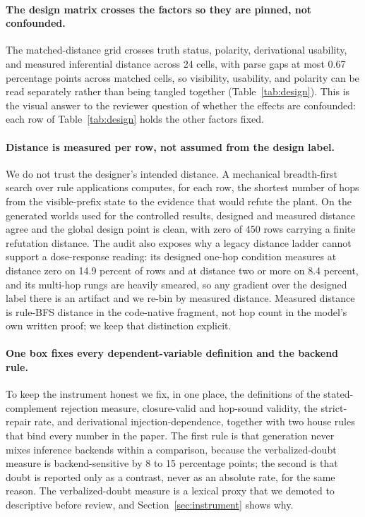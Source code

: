 \paragraph{The design matrix crosses the factors so they are pinned, not
confounded.} The matched-distance grid crosses truth status, polarity,
derivational usability, and measured inferential distance across 24 cells,
with parse gaps at most 0.67 percentage points across matched cells, so
visibility, usability, and polarity can be read separately rather than
being tangled together (Table~\ref{tab:design}).
This is the visual answer to the reviewer question of whether the effects
are confounded: each row of Table~\ref{tab:design} holds the other factors
fixed.

\paragraph{Distance is measured per row, not assumed from the design
label.} We do not trust the designer's intended distance. A mechanical
breadth-first search over rule applications computes, for each row, the
shortest number of hops from the visible-prefix state to the evidence that
would refute the plant. On the generated worlds used for the controlled
results, designed and measured distance agree and the global design point
is clean, with zero of 450 rows carrying a finite refutation distance.
The audit also exposes why a legacy distance ladder cannot support a
dose-response reading: its designed one-hop condition measures at distance
zero on 14.9 percent of rows and at distance two or more on 8.4 percent,
and its multi-hop rungs are heavily smeared, so any gradient over the
designed label there is an artifact and we re-bin by measured distance.
Measured distance is rule-BFS distance in the code-native fragment, not hop
count in the model's own written proof; we keep that distinction explicit.

\paragraph{One box fixes every dependent-variable definition and the
backend rule.} To keep the instrument honest we fix, in one place, the
definitions of the stated-complement rejection measure, closure-valid and
hop-sound validity, the strict-repair rate, and derivational
injection-dependence, together with two house rules that bind every number
in the paper.
The first rule is that generation never mixes inference backends within a
comparison, because the verbalized-doubt measure is backend-sensitive by 8
to 15 percentage points; the second is that doubt is reported only as a
contrast, never as an absolute rate, for the same reason.
The verbalized-doubt measure is a lexical proxy that we demoted to
descriptive before review, and Section~\ref{sec:instrument} shows why.

